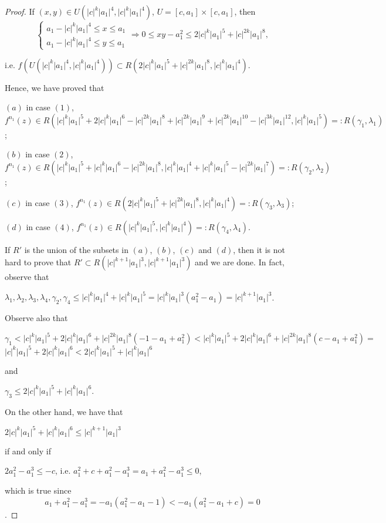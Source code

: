 \documentclass[11pt]{amsart}
\theoremstyle{definition}
\begin{document}
\begin{proof}
If $(x,y)\in U(|c|^k|a_1|^4,|c|^k|a_1|^4)$, $U=[c,a_1]\times [c,a_1]$, then
$$\left\{
\begin{array}{l}
a_1-|c|^k|a_1|^4\leq x\leq a_1 \\
a_1-|c|^k|a_1|^4\leq y\leq a_1
\end{array}
\right.
\Longrightarrow 0\leq xy-a_1^2\leq 2|c|^k|a_1|^5+|c|^{2k}|a_1|^8,
$$

\noindent i.e. $f( U(|c|^k|a_1|^4,|c|^k|a_1|^4))\subset R(2|c|^k|a_1|^5+|c|^{2k}|a_1|^8,|c|^k|a_1|^4)$.
	
\vspace{1em} 

Hence, we have proved that

\noindent $(a)$ in case $(1)$,  $f^{n_{1}}(z)\in R(|c|^k|a_1|^5+2|c|^k|a_1|^6-|c|^{2k}|a_1|^8+|c|^{2k}|a_1|^9+|c|^{2k}|a_1|^{10}-|c|^{3k}|a_1|^{12}, |c|^k|a_1|^5)=: R(\gamma_1,\lambda_1)$;

\noindent $(b)$ in case $(2)$, $f^{n_{1}}(z)\in  R(|c|^k|a_1|^5+|c|^k|a_1|^6-|c|^{2k}|a_1|^8,|c|^k|a_1|^4+|c|^k|a_1|^5-|c|^{2k}|a_1|^7)=: R(\gamma_2,\lambda_2)$;

\noindent $(c)$ in case $(3)$, $f^{n_{1}}(z)\in R(2|c|^k|a_1|^5+|c|^{2k}|a_1|^8,|c|^k|a_1|^4)=: R(\gamma_3,\lambda_3)$;

\noindent $(d)$ in case $(4)$, $f^{n_{1}}(z)\in R(|c|^k|a_1|^5,|c|^k|a_1|^4)=: R(\gamma_4,\lambda_4)$.
	
If $R'$ is the union of the subsets in $(a)$, $(b)$, $(c)$ and $(d)$, then it is not hard to prove that $R'\subset R(|c|^{k+1}|a_1|^3,|c|^{k+1}|a_1|^3 )$ and we are done. In fact, 
observe that
\begin{center}
$\lambda_1,\lambda_2,\lambda_3,\lambda_4,\gamma_2,\gamma_4\leq |c|^k|a_1|^4+|c|^k|a_1|^5=|c|^k|a_1|^3(a_1^2-a_1)=|c|^{k+1}|a_1|^3$.
\end{center}

Observe also that
\begin{center}
$\gamma_1<|c|^k|a_1|^5+2|c|^k|a_1|^6+|c|^{2k}|a_1|^8(-1-a_1+a_1^2) <|c|^k|a_1|^5+2|c|^k|a_1|^6+|c|^{2k}|a_1|^8(c-a_1+a_1^2)=$  $|c|^k|a_1|^5+2|c|^k|a_1|^6 < 2|c|^k|a_1|^5+|c|^k|a_1|^6 $
\end{center}
and
\begin{center}
	$\gamma_3\leq 2|c|^k|a_1|^5+|c|^k|a_1|^6 $.
\end{center}
On the other hand, we have that
\begin{center}
$2|c|^k|a_1|^5+|c|^k|a_1|^6 \leq |c|^{k+1}|a_1|^3$
\end{center}
if and only if
\begin{center}
$2a_1^2-a_1^3\leq -c$, i.e. $a_1^2+c+a_1^2-a_1^3=a_1+a_1^2-a_1^3\leq 0$,
\end{center}
which is true since $$a_1+a_1^2-a_1^3=-a_1(a_1^2-a_1-1)<-a_1(a_1^2-a_1+c)=0$$.
\end{proof}
\end{document}

